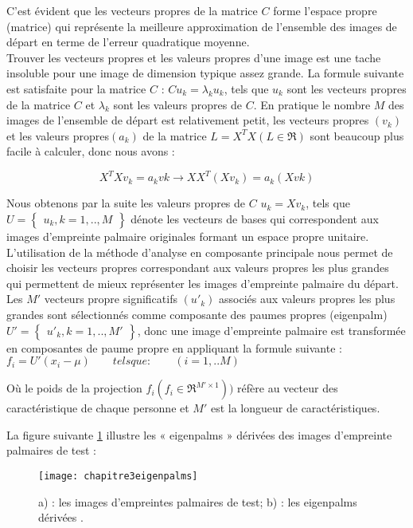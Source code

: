C'est évident que les vecteurs propres de la matrice $C$ forme l'espace propre (matrice) qui représente la meilleure approximation de l'ensemble des images de départ en terme de l'erreur quadratique moyenne.
\\Trouver les vecteurs propres et les valeurs propres d'une image est une tache insoluble pour une image de dimension typique assez grande. La formule suivante est satisfaite pour la matrice $C$ : $Cu_{k}= \lambda_{k}u_{k}$, tels que $u_{k}$ sont les vecteurs propres de la matrice $C $ et $\lambda_{k}$ sont les valeurs propres de $C$.
En pratique le nombre $M$ des images de l'ensemble de départ est relativement petit, les vecteurs propres $(v_{k})$ et les valeurs propres$(a_{k})$ de la matrice $ L=X^{T}X(L \in\Re)$ sont beaucoup plus facile à calculer, donc nous avons : 
	\begin{center}
	\begin{equation}\label{eq:chapitre3eq3}
	X^{T}Xv_{k}=a_{k}v{k} \rightarrow XX^{T}(Xv_{k})=a_{k}(Xv{k})
	\end{equation}
\end{center}
Nous obtenons par la suite les valeurs propres de $C$ $u_{k}=Xv_{k}$, tels que $ U=\begin{Bmatrix}u_{k},k=1,..,M \end{Bmatrix} $ dénote les vecteurs de bases qui correspondent aux images d'empreinte palmaire originales formant un espace propre unitaire.
\\ L'utilisation de la méthode d'analyse en composante principale nous permet de choisir les vecteurs propres correspondant aux valeurs propres les plus grandes qui permettent de mieux représenter les images d'empreinte palmaire du départ. Les $ {M}'$ vecteurs propre significatifs $({u}'_{k})$ associés aux valeurs propres les plus grandes sont sélectionnés comme composante des paumes propres (eigenpalm) $ {U}'=\begin{Bmatrix} {u}'_{k},k=1,..,{M}'\end{Bmatrix} $, donc une image d'empreinte palmaire est transformée en composantes de paume propre en appliquant la formule suivante : $f_{i}={U}'(x_{i}-\mu) \qquad tels que :\qquad (i=1,..M)$

Où le poids de la projection $f_{i}(f_{i} \in \Re ^{{M}'\times 1}))$ réfère au vecteur des caractéristique de chaque personne et $ {M}'$ est la longueur de caractéristiques\citep{lu2003palmprint}.

La figure suivante \ref{fig:chapitre3eigenpalms} illustre les « eigenpalms » dérivées des images d'empreinte palmaires de test :
\begin{center}
	\begin{figure}[H]
		\centering
		 \texttt{[image: chapitre3eigenpalms]}
		\caption{ a) : les images d'empreintes palmaires de test; b) : les eigenpalms dérivées \citep{lu2003palmprint}.}
		\label{fig:chapitre3eigenpalms}
	\end{figure}
\end{center}
